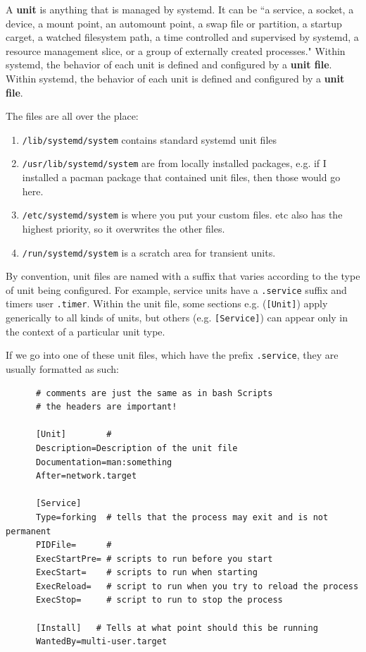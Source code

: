 \documentclass{article}
\begin{document}
  \begin{definition}
    A \textbf{unit} is anything that is managed by systemd. It can be ``a service, a socket, a device, a mount point, an automount point, a swap file or partition, a startup carget, a watched filesystem path, a time controlled and supervised by systemd, a resource management slice, or a group of externally created processes." Within systemd, the behavior of each unit is defined and configured by a \textbf{unit file}. Within systemd, the behavior of each unit is defined and configured by a \textbf{unit file}. 

    The files are all over the place: 
      \begin{enumerate}
        \item \texttt{/lib/systemd/system} contains standard systemd unit files 
        \item \texttt{/usr/lib/systemd/system} are from locally installed packages, e.g. if I installed a pacman package that contained unit files, then those would go here. 
        \item \texttt{/etc/systemd/system} is where you put your custom files. etc also has the highest priority, so it overwrites the other files.  
        \item \texttt{/run/systemd/system} is a scratch area for transient units. 
      \end{enumerate}

    By convention, unit files are named with a suffix that varies according to the type of unit being configured. For example, service units have a \texttt{.service} suffix and timers user \texttt{.timer}. Within the unit file, some sections e.g. (\texttt{[Unit]}) apply generically to all kinds of units, but others (e.g. \texttt{[Service]}) can appear only in the context of a particular unit type. 

  \end{definition}

  \begin{example}
    If we go into one of these unit files, which have the prefix \texttt{.service}, they are usually formatted as such: 

    \begin{lstlisting}
      # comments are just the same as in bash Scripts
      # the headers are important! 

      [Unit]        #  
      Description=Description of the unit file 
      Documentation=man:something 
      After=network.target

      [Service]
      Type=forking  # tells that the process may exit and is not permanent
      PIDFile=      # 
      ExecStartPre= # scripts to run before you start 
      ExecStart=    # scripts to run when starting 
      ExecReload=   # script to run when you try to reload the process
      ExecStop=     # script to run to stop the process 

      [Install]   # Tells at what point should this be running
      WantedBy=multi-user.target 

    \end{lstlisting} 
  \end{example}
  
\end{document}

